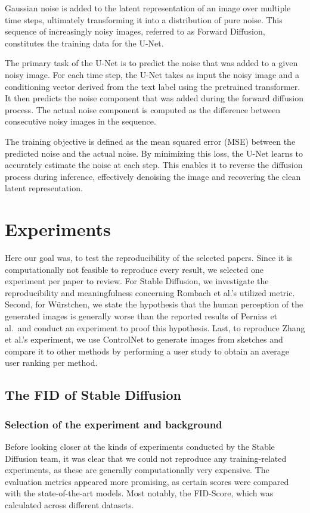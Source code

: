 \documentclass[11pt]{article}
\begin{document}
Gaussian noise is added to the latent representation of an image over multiple time steps, ultimately transforming it into a distribution of pure noise. This sequence of increasingly noisy images, referred to as Forward Diffusion, constitutes the training data for the U-Net.

The primary task of the U-Net is to predict the noise that was added to a given noisy image. For each time step, the U-Net takes as input the noisy image and a conditioning vector derived from the text label using the pretrained transformer. It then predicts the noise component that was added during the forward diffusion process. The actual noise component is computed as the difference between consecutive noisy images in the sequence.

The training objective is defined as the mean squared error (MSE) between the predicted noise and the actual noise. By minimizing this loss, the U-Net learns to accurately estimate the noise at each step. This enables it to reverse the diffusion process during inference, effectively denoising the image and recovering the clean latent representation.





\newpage
\section{Experiments}
Here our goal was, to test the reproducibility of the selected papers. Since it is computationally not feasible to reproduce every result, we selected one experiment per paper to review. For Stable Diffusion, we investigate the reproducibility and meaningfulness concerning Rombach et al.'s utilized metric. Second, for W\"urstchen, we state the hypothesis that the human perception of the generated images is generally worse than the reported results of Pernias et al.\ and conduct an experiment to proof this hypothesis. Last, to reproduce Zhang et al.'s experiment, we use ControlNet to generate images from sketches and compare it to other methods by performing a user study to obtain an average user ranking per method.

\subsection{The FID of Stable Diffusion}
\subsubsection{Selection of the experiment and background}
\label{sec:experiments:stabel_diffusion:selction_of_fid}
Before looking closer at the kinds of experiments conducted by the Stable Diffusion team, it was clear that we could not reproduce any training-related experiments, as these are generally computationally very expensive. The evaluation metrics appeared more promising, as certain scores were compared with the state-of-the-art models. Most notably, the FID-Score, which was calculated across different datasets.
\end{document}
